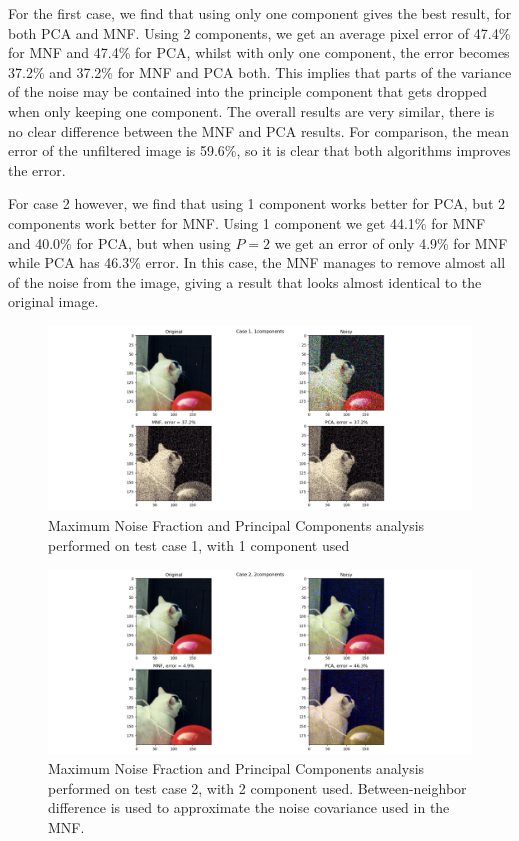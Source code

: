 For the first case, we find that using only one component gives the best result, for both PCA and MNF. Using 
2 components, we get an average pixel error of 47.4\% for MNF and 47.4\% for PCA, whilst with only one component, 
the error becomes 37.2\% and 37.2\% for MNF and PCA both. This implies that parts of the variance of 
the noise may be contained into the principle component that gets dropped when only keeping one component. 
The overall results are very similar, there is no clear difference between the MNF and PCA results. For comparison, 
the mean error of the unfiltered image is 59.6\%, so it is clear that both algorithms improves the error. 

For case 2 however, we find that using 1 component works better for PCA, but 2 components 
work better for MNF. Using 1 component we get 44.1\% for MNF and 40.0\% for PCA, but 
when using $P = 2$ we get an error of only 4.9\% for MNF while PCA has 46.3\% error. 
In this case, the MNF manages to remove almost all of the noise from the image, giving a result 
that looks almost identical to the original image.


\begin{figure}
    \centering
    \includegraphics[width=\textwidth]{../fig/task_3_case_1_P_1}
    \caption{Maximum Noise Fraction and Principal Components analysis performed on test case 1, with 1 component used}
    \label{fig:mnf_test_1_1}
\end{figure}

\begin{figure}
    \centering
    \includegraphics[width=\textwidth]{../fig/task_3_case_2_P_2}
    \caption{Maximum Noise Fraction and Principal Components analysis performed on test case 2, with 2 component used. 
    Between-neighbor difference is used to approximate the noise covariance used in the MNF.}
    \label{fig:mnf_test_2_2}
\end{figure}



